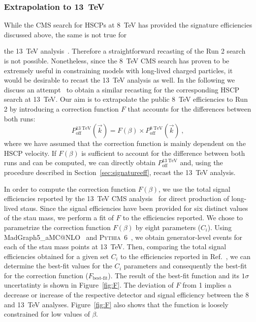 \subsubsection{Extrapolation to 13~TeV} \label{sec:extra}

While the CMS search for HSCPs at 8~TeV has provided the
signature efficiencies discussed above, the same is not true for

the 13~TeV analysis~\cite{CMS-PAS-EXO-16-036}.
Therefore a straightforward recasting of the Run 2 search is not possible.
Nonetheless, since the 8~TeV CMS search has proven to be extremely useful
in constraining models with long-lived charged particles,
it would be desirable to recast the 13~TeV analysis as well.
In the following we discuss an attempt~\cite{LesHouches2017}
to obtain a similar recasting for the corresponding HSCP search at 13~TeV.
Our aim is to extrapolate the public 8~TeV efficiencies to Run 2 by
introducing a correction function $F$ that accounts for the differences between both runs:
\begin{equation}
\label{eq:introF}
P^{13~\text{TeV}}_{\text{off}}(\vec{k}) = F(\beta) \times
P^{8~\text{TeV}}_{\text{off}}(\vec{k})~,
\end{equation}
where we have assumed that the correction function is mainly dependent on the
HSCP velocity. If $F(\beta)$ is sufficient to account for the difference
between both runs and can be computed, we can directly obtain
$P^{13~\text{TeV}}_{\text{off}}$ and, using the procedure described in
Section~\ref{sec:signatureeff}, recast the 13~TeV analysis.

In order to compute the correction function $F(\beta)$, we use
the total signal efficiencies reported by the
13~TeV CMS analysis~\cite{CMS-PAS-EXO-16-036} for
direct production of long-lived staus.
Since the signal efficiencies have been provided for six distinct
values of the stau mass, we perform a fit of $F$ to the efficiencies reported.
We chose to parametrize the correction function $F(\beta)$ by eight parameters
($C_{i}$).
Using {\sc MadGraph5\_aMC@NLO}~\cite{Alwall:2014hca}
and \textsc{Pythia}~6~\cite{Sjostrand:2006za}, we obtain generator-level events
for each of the stau mass points at 13~TeV.
Then, comparing the total signal efficiencies obtained for a given set $C_{i}$
to the efficiencies reported in Ref.~\cite{CMS-PAS-EXO-16-036}, we can determine
the best-fit values for the $C_{i}$ parameters and consequently the
best-fit for the correction function ($F_\text{best-fit}$).
The result of the best-fit function and its $1\sigma$ uncertatinty is shown in
Figure~\ref{fig:F}. The deviation of $F$ from 1 implies a decrease or increase
of the respective detector and signal efficiency between the 8 and 13~TeV
analyses. Figure~\ref{fig:F} also shows that the function is loosely constrained
for low values of $\beta$.

